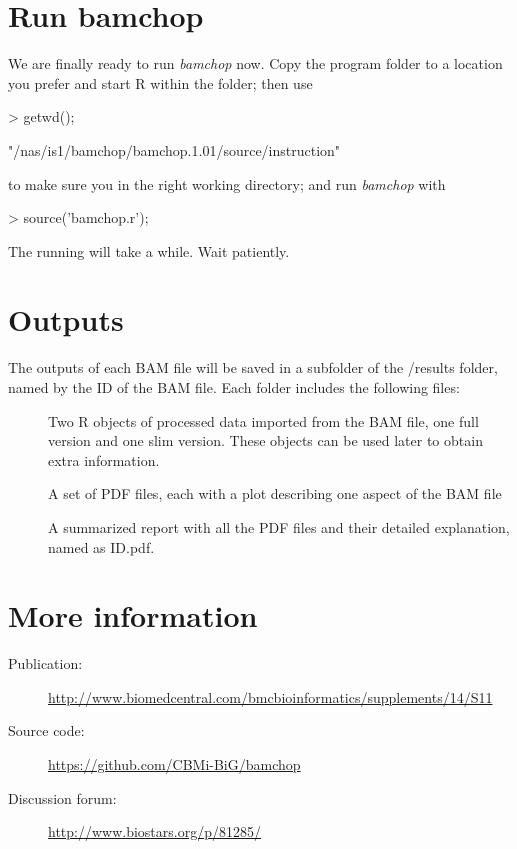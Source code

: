\documentclass{article}
\begin{document}
\section{Run bamchop}
We are finally ready to run \textit{bamchop} now. Copy the program folder to a location you prefer and start R within the folder; then use
\begin{Schunk}
\begin{Sinput}
> getwd();
\end{Sinput}
\begin{Soutput}
[1] "/nas/is1/bamchop/bamchop.1.01/source/instruction"
\end{Soutput}
\end{Schunk}
to make sure you in the right working directory; and run \textit{bamchop} with
\begin{Schunk}
\begin{Sinput}
> source('bamchop.r');
\end{Sinput}
\end{Schunk}
The running will take a while. Wait patiently. 

\section{Outputs}
The outputs of each BAM file will be saved in a subfolder of the /results folder, named by the ID of the BAM file. Each folder includes the following files:
\begin{description}
\item[] Two R objects of processed data imported from the BAM file, one full version and one slim version. These objects can be used later to obtain extra information.
\item[] A set of PDF files, each with a plot describing one aspect of the BAM file
\item[] A summarized report with all the PDF files and their detailed explanation, named as ID.pdf.
\end{description}


\section{More information}
\begin{description}
\item[Publication: ] \url{http://www.biomedcentral.com/bmcbioinformatics/supplements/14/S11}
\item[Source code: ] \url{https://github.com/CBMi-BiG/bamchop}
\item[Discussion forum:] \url{http://www.biostars.org/p/81285/}
\end{description}
\end{document}
